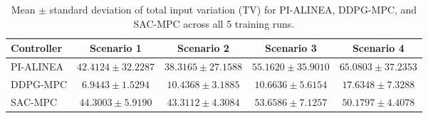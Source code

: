\begin{table}[htbp]
\centering
\caption{Mean $\pm$ standard deviation of total input variation (TV) for PI-ALINEA, DDPG-MPC, and SAC-MPC across all 5 training runs.}
\label{tab:tv_multi}
\begin{tabular}{lcccc}
\toprule
Controller & Scenario 1 & Scenario 2 & Scenario 3 & Scenario 4 \\
\midrule
PI-ALINEA & $42.4124 \pm 32.2287$ & $38.3165 \pm 27.1588$ & $55.1620 \pm 35.9010$ & $65.0803 \pm 37.2353$ \\
DDPG-MPC & $6.9443 \pm 1.5294$ & $10.4368 \pm 3.1885$ & $10.6636 \pm 5.6154$ & $17.6348 \pm 7.3288$ \\
SAC-MPC & $44.3003 \pm 5.9190$ & $43.3112 \pm 4.3084$ & $53.6586 \pm 7.1257$ & $50.1797 \pm 4.4078$ \\
\bottomrule
\end{tabular}
\end{table}
